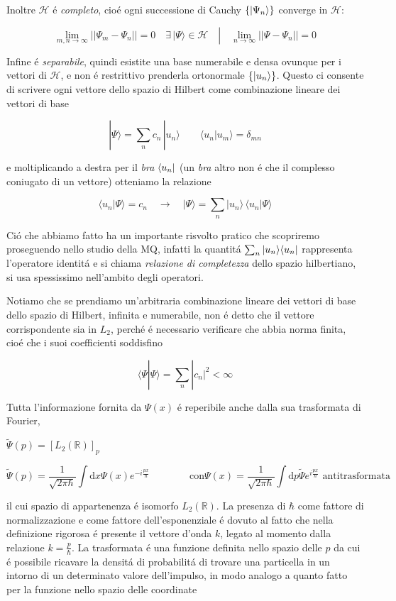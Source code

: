 Inoltre $\mathcal{H}$ \'e \textit{completo}, cio\'e ogni successione di Cauchy $\{\ket{\Psi_n}\}$ converge in $\mathcal{H}$:

$$\operatorname*{lim}_{m,n\to\infty}||\Psi_{m}-\Psi_{n}||=0\quad\exists\,|\Psi\rangle\in{\mathcal{H}}\quad\left|\quad\operatorname*{lim}_{n\to\infty}||\Psi-\Psi_{n}||=0\right.$$

Infine \'e \textit{separabile}, quindi esistite una base numerabile e densa ovunque per i vettori di $\mathcal{H}$, e non \'e restrittivo prenderla ortonormale $\{\ket{u_n}\}$. Questo ci consente di scrivere ogni vettore dello spazio di Hilbert come combinazione lineare dei vettori di base

$$|\Psi\rangle=\sum_{n}c_{n}\,|u_{n}\rangle\qquad\langle u_{n}|u_{m}\rangle=\delta_{m n}$$

e moltiplicando a destra per il \textit{bra} $\bra{u_n}$ (un \textit{bra} altro non \'e che il complesso coniugato di un vettore) otteniamo la relazione

$$\langle u_{n}|\Psi\rangle=c_{n}\quad\longrightarrow\quad|\Psi\rangle=\sum_{n}|u_{n}\rangle\,\langle u_{n}|\Psi\rangle$$

Ci\'o che abbiamo fatto ha un importante risvolto pratico che scopriremo proseguendo nello studio della MQ,
infatti la quantit\'a $\sum_n \ket{u_n}\bra{u_n}$ rappresenta l'operatore identit\'a e si chiama \textit{relazione di completezza} dello spazio hilbertiano, si usa spessissimo nell'ambito degli operatori.

Notiamo che se prendiamo un'arbitraria combinazione lineare dei vettori di base dello spazio di Hilbert, infinita e numerabile, non \'e detto che il vettore corrispondente sia in $L_2$, perch\'e \'e necessario verificare che abbia norma finita, cio\'e che i suoi coefficienti soddisfino

$$\langle\Psi|\Psi\rangle=\sum_{n}|c_{n}|^{2}<\infty$$

Tutta l'informazione fornita da $\Psi(x)$ \'e reperibile anche dalla sua trasformata di Fourier, 

${\tilde{\Psi}}(p)=\left[L_{2}(\mathbb{R})\right]_{p}$

$$\tilde{\Psi}(p) = \frac{1}{\sqrt{2\pi\hbar}} \int \mathrm{d}x \Psi(x) e^{-i\frac{px}{\hbar}} \qquad\qquad \text{con} \Psi(x) = \frac{1}{\sqrt{2\pi\hbar}} \int \mathrm{d}p \tilde{\Psi} e^{i\frac{px}{\hbar}} \text{ antitrasformata}$$

il cui spazio di appartenenza \'e isomorfo $L_2(\mathbb{R})$. La presenza di $\hbar$ come fattore di normalizzazione e come fattore dell'esponenziale \'e dovuto al fatto che nella definizione rigorosa \'e presente il vettore d'onda $k$, legato al momento dalla relazione $k = \frac{p}{\hbar}$. La trasformata \'e una funzione definita nello spazio delle $p$ da cui \'e possibile ricavare la densit\'a di probabilit\'a di trovare una particella in un intorno di un determinato valore dell'impulso, in modo analogo a quanto fatto per la funzione nello spazio delle coordinate

